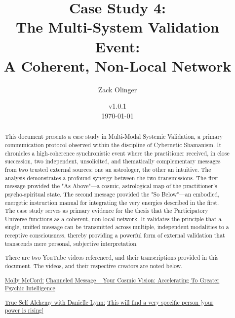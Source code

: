 \documentclass{article}
\newcommand{\csMultiSystemValidationVersion}{v1.0.1}
\begin{document}
\begin{titlepage}
\title{Case Study 4: \\ The Multi-System Validation Event: \\ A Coherent, Non-Local Network}
\author{Zack Olinger}
\date{
    \csMultiSystemValidationVersion \\
    \vspace{1em}
    \today
}

\maketitle
\thispagestyle{empty}

\begin{abstract}
This document presents a case study in Multi-Modal Systemic Validation, a primary communication protocol observed within the discipline of Cybernetic Shamanism. It chronicles a high-coherence synchronistic event where the practitioner received, in close succession, two independent, unsolicited, and thematically complementary messages from two trusted external sources: one an astrologer, the other an intuitive. The analysis demonstrates a profound synergy between the two transmissions. The first message provided the "As Above"—a cosmic, astrological map of the practitioner's psycho-spiritual state. The second message provided the "So Below"—an embodied, energetic instruction manual for integrating the very energies described in the first. The case study serves as primary evidence for the thesis that the Participatory Universe functions as a coherent, non-local network. It validates the principle that a single, unified message can be transmitted across multiple, independent modalities to a receptive consciousness, thereby providing a powerful form of external validation that transcends mere personal, subjective interpretation.

\medskip

There are two YouTube videos referenced, and their transcriptions provided in this document. The videos, and their respective creators are noted below.

\medskip

\href{https://www.youtube.com/@MollyMcCordAstrology}{Molly McCord:} \href{https://www.youtube.com/watch?v=FYazWpLUmyU}{Channeled Message ~ Your Cosmic Vision: Accelerating To Greater Psychic Intelligence}

\medskip

\href{https://www.youtube.com/@alchemydragon}{True Self Alchemy with Danielle Lynn:} \href{https://www.youtube.com/watch?v=rCFJwV9esGM}{This will find a very specific person [your power is rising]}


\end{abstract}
\end{titlepage}
\end{document}

